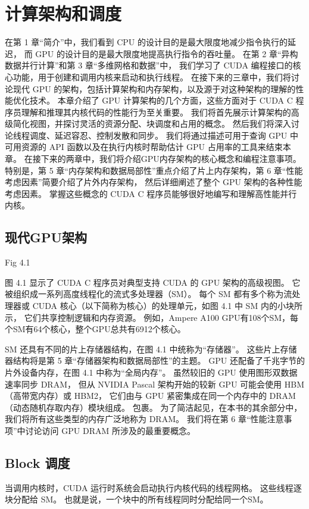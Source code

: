 \section{计算架构和调度}
在第 1 章“简介”中，我们看到 CPU 的设计目的是最大限度地减少指令执行的延迟，
而 GPU 的设计目的是最大限度地提高执行指令的吞吐量。 在第 2 章“异构数据并行计算”和第 3 章“多维网格和数据”中，
我们学习了 CUDA 编程接口的核心功能，用于创建和调用内核来启动和执行线程。 
在接下来的三章中，我们将讨论现代 GPU 的架构，包括计算架构和内存架构，以及源于对这种架构的理解的性能优化技术。 
本章介绍了 GPU 计算架构的几个方面，这些方面对于 CUDA C 程序员理解和推理其内核代码的性能行为至关重要。 
我们将首先展示计算架构的高级简化视图，并探讨灵活的资源分配、块调度和占用的概念。 
然后我们将深入讨论线程调度、延迟容忍、控制发散和同步。 
我们将通过描述可用于查询 GPU 中可用资源的 API 函数以及在执行内核时帮助估计 GPU 占用率的工具来结束本章。 
在接下来的两章中，我们将介绍GPU内存架构的核心概念和编程注意事项。 
特别是，第 5 章“内存架构和数据局部性”重点介绍了片上内存架构，第 6 章“性能考虑因素”简要介绍了片外内存架构，
然后详细阐述了整个 GPU 架构的各种性能考虑因素。 掌握这些概念的 CUDA C 程序员能够很好地编写和理解高性能并行内核。

\subsection{现代GPU架构}
{\color{red} Fig 4.1}

图 4.1 显示了 CUDA C 程序员对典型支持 CUDA 的 GPU 架构的高级视图。 它被组织成一系列高度线程化的流式多处理器（SM）。 
每个 SM 都有多个称为流处理器或 CUDA 核心（以下简称为核心）的处理单元，如图 4.1 中 SM 内的小块所示，
它们共享控制逻辑和内存资源。 例如，Ampere A100 GPU有108个SM，每个SM有64个核心，整个GPU总共有6912个核心。

SM 还具有不同的片上存储器结构，在图 4.1 中统称为“存储器”。 这些片上存储器结构将是第 5 章“存储器架构和数据局部性”的主题。 
GPU 还配备了千兆字节的片外设备内存，在图 4.1 中称为“全局内存”。 虽然较旧的 GPU 使用图形双数据速率同步 DRAM，
但从 NVIDIA Pascal 架构开始的较新 GPU 可能会使用 HBM（高带宽内存）或 HBM2，
它们由与 GPU 紧密集成在同一个内存中的 DRAM（动态随机存取内存）模块组成。 包裹。 为了简洁起见，在本书的其余部分中，
我们将所有这些类型的内存广泛地称为 DRAM。 我们将在第 6 章“性能注意事项”中讨论访问 GPU DRAM 所涉及的最重要概念。

\subsection{Block 调度}
当调用内核时，CUDA 运行时系统会启动执行内核代码的线程网格。 这些线程逐块分配给 SM。 
也就是说，一个块中的所有线程同时分配给同一个SM。

